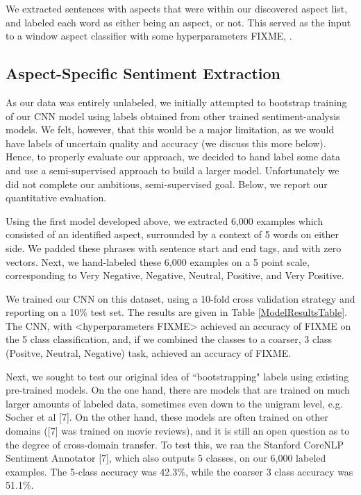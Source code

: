 \documentclass{article} %
\begin{document}
We extracted sentences with aspects that were within our discovered aspect list, and labeled each word as either being an aspect, or not. This served as the input to a window aspect classifier with some hyperparameters FIXME, . 


\subsection{Aspect-Specific Sentiment Extraction}



As our data was entirely unlabeled, we initially attempted to bootstrap training of our CNN model using labels obtained from other trained sentiment-analysis models. We felt, however, that this would be a major limitation, as we would have labels of uncertain quality and accuracy (we discuss this more below). Hence, to properly evaluate our approach, we decided to hand label some data and use a semi-supervised approach to build a larger model. Unfortunately we did not complete our ambitious, semi-supervised goal. Below, we report our quantitative evaluation.

Using the first model developed above, we extracted 6,000 examples which consisted of an identified aspect, surrounded by a context of 5 words on either side. We padded these phrases with sentence start and end tags, and with zero vectors. Next, we hand-labeled these 6,000 examples on a 5 point scale, corresponding to Very Negative, Negative, Neutral, Positive, and Very Positive. 

We trained our CNN on this dataset, using a 10-fold cross validation strategy and reporting on a 10\% test set. The results are given in Table \ref{ModelResultsTable}. The CNN, with <hyperparameters FIXME> achieved an accuracy of FIXME on the 5 class classification, and, if we combined the classes to a coarser, 3 class (Positve, Neutral, Negative) task, achieved an accuracy of FIXME.

Next, we sought to test our original idea of ``bootstrapping" labels using existing pre-trained models. On the one hand, there are models that are trained on much larger amounts of labeled data, sometimes even down to the unigram level, e.g. Socher et al [7]. On the other hand, these models are often trained on other domains ([7] was trained on movie reviews), and it is still an open question as to the degree of cross-domain transfer. To test this, we ran the Stanford CoreNLP Sentiment Annotator [7], which also outputs 5 classes, on our 6,000 labeled examples. The 5-class accuracy was 42.3\%, while the coarser 3 class accuracy was 51.1\%.
\end{document}
